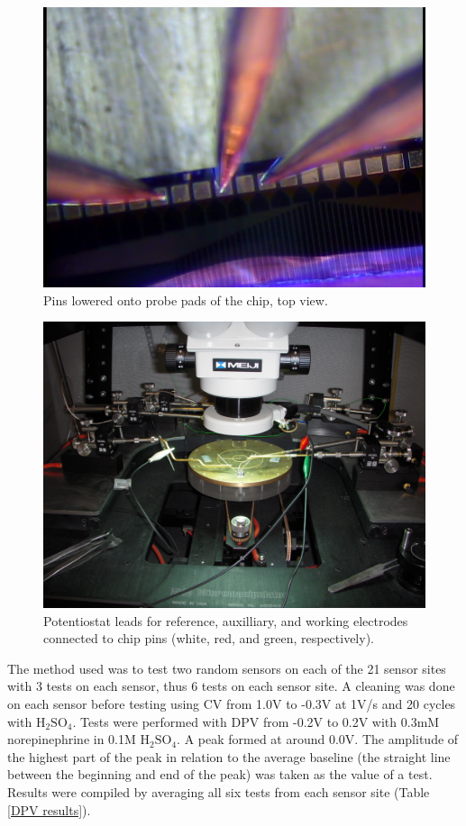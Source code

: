\begin{figure}
	\centering
	\includegraphics[width=\linewidth]{figures/chippins-top.png}
	\caption{Pins lowered onto probe pads of the chip, top view.}
	\label{chippins-top}
\end{figure}

\begin{figure}
	\centering
	\includegraphics[width=\linewidth]{figures/potentiostatleads.png}
	\caption[Potentiostat leads connected to pins.]{Potentiostat leads for reference, auxilliary, and working electrodes connected to chip pins (white, red, and green, respectively).}
	\label{potentiostatleads}
\end{figure}

The method used was to test two random sensors on each of the 21 sensor sites with 3 tests on each sensor, thus 6 tests on each sensor site. A cleaning was done on each sensor before testing using CV from 1.0V to -0.3V at 1V/s and 20 cycles with $\mathrm{H_2SO_4}$. Tests were performed with DPV from -0.2V to 0.2V with 0.3mM norepinephrine in 0.1M $\mathrm{H_2SO_4}$. A peak formed at around 0.0V. The amplitude of the highest part of the peak in relation to the average baseline (the straight line between the beginning and end of the peak) was taken as the value of a test. Results were compiled by averaging all six tests from each sensor site (Table \ref{DPV results}).

